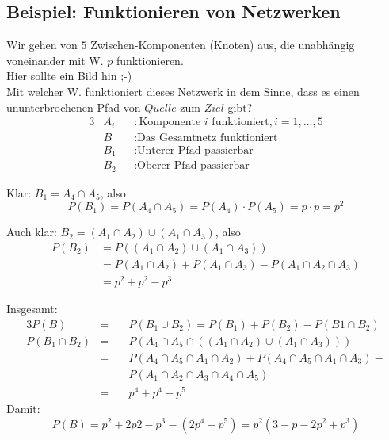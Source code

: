 \subsection{Beispiel: Funktionieren von Netzwerken}

Wir gehen von $5$ Zwischen-Komponenten (Knoten) aus, die unabhängig voneinander mit W. $p$ funktionieren.\\
Hier sollte ein Bild hin ;-)\\

Mit welcher W. funktioniert dieses Netzwerk in dem Sinne, dass es einen ununterbrochenen Pfad von $Quelle$ zum $Ziel$ gibt?\\

\begin{alignat*}{3}
&A_i &&: \text{Komponente $i$ funktioniert}, i = 1,\ldots,5 \\
&B   &&: \text{Das Gesamtnetz funktioniert} \\
&B_1 &&: \text{Unterer Pfad passierbar} \\
&B_2 &&: \text{Oberer Pfad passierbar}
\end{alignat*}

Klar:
$
	B_1 = A_4 \cap A_5
$, also
\[
	P(B_1) = P(A_4\cap A_5) = P(A_4)\cdot P(A_5) = p\cdot p = p^2
\]

Auch klar:
$
	B_2 = (A_1 \cap A_2) \cup (A_1 \cap A_3)
$, also
\begin{align*}
	P(B_2) &= P((A_1\cap A_2) \cup (A_1\cap A_3))  \\
               &= P(A_1 \cap A_2) + P(A_1 \cap A_3) - P(A_1\cap A_2\cap A_3) \\
               &= p^2 + p^2 - p^3
\end{align*}

Insgesamt:
\begin{alignat*}{3}
	P(B)            &= \ && P(B_1 \cup B_2) = P(B_1) + P(B_2) - P(B1 \cap B_2) \\
	P(B_1 \cap B_2) &= \ && P\left( A_4 \cap A_5 \cap ((A_1 \cap A_2) \cup (A_1 \cap A_3)) \right) \\
                        &= \ && P(A_4 \cap A_5 \cap A_1 \cap A_2) + P(A_4 \cap A_5 \cap A_1 \cap A_3) - \\
                        &  \ && P(A_1 \cap A_2 \cap A_3 \cap A_4 \cap A_5) \\
                        &= \ && p^4 + p^4 - p^5
\end{alignat*}
Damit:
\[
	P(B) = p^2 + 2p2 - p^3 - (2p^4-p^5) = p^2(3-p-2p^2+p^3)
\]
